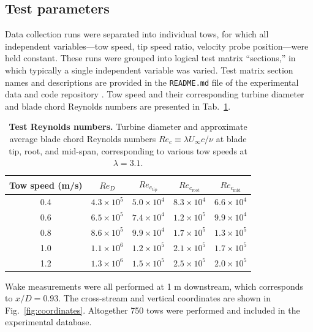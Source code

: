 \documentclass[10pt,letterpaper]{article}
\begin{document}
\subsection*{Test parameters}

Data collection runs were separated into individual tows, for which all
independent variables---tow speed, tip speed ratio, velocity probe
position---were held constant. These runs were grouped into logical test matrix
``sections,'' in which typically a single independent variable was varied. Test
matrix section names and descriptions are provided in the \texttt{README.md}
file of the experimental data and code repository \cite{Bachant2016-RM2-data}.
Tow speed and their corresponding turbine diameter and blade chord Reynolds
numbers are presented in Tab.~\ref{tab:re}.

\begin{table}
\centering
\begin{tabular}{c|c|c|c|c}
Tow speed (m/s) & $Re_D$ & $Re_{c_\mathrm{tip}}$ & $Re_{c_\mathrm{root}}$ & $Re_{c_\mathrm{mid}}$\\
\hline
0.4 & $4.3 \times 10^5$ & $5.0 \times 10^4$ & $8.3 \times 10^4$ & $6.6 \times 10^4$ \\
0.6 & $6.5 \times 10^5$ & $7.4 \times 10^4$ & $1.2 \times 10^5$ & $9.9 \times 10^4$ \\
0.8 & $8.6 \times 10^5$ & $9.9 \times 10^4$ & $1.7 \times 10^5$ & $1.3 \times 10^5$ \\
1.0 & $1.1 \times 10^6$ & $1.2 \times 10^5$ & $2.1 \times 10^5$ & $1.7 \times 10^5$ \\
1.2 & $1.3 \times 10^6$ & $1.5 \times 10^5$ & $2.5 \times 10^5$ & $2.0 \times 10^5$ \\
\end{tabular}

\caption{{\bf Test Reynolds numbers.} Turbine diameter and approximate average
blade chord Reynolds numbers $Re_c \equiv \lambda U_\infty c / \nu$ at blade
tip, root, and mid-span, corresponding to various tow speeds at $\lambda=3.1$.}

\label{tab:re}
\end{table}

Wake measurements were all performed at 1 m downstream, which corresponds to
$x/D = 0.93$. The cross-stream and vertical coordinates are shown in
Fig.~\ref{fig:coordinates}. Altogether 750 tows were performed and included in
the experimental database.
\end{document}

